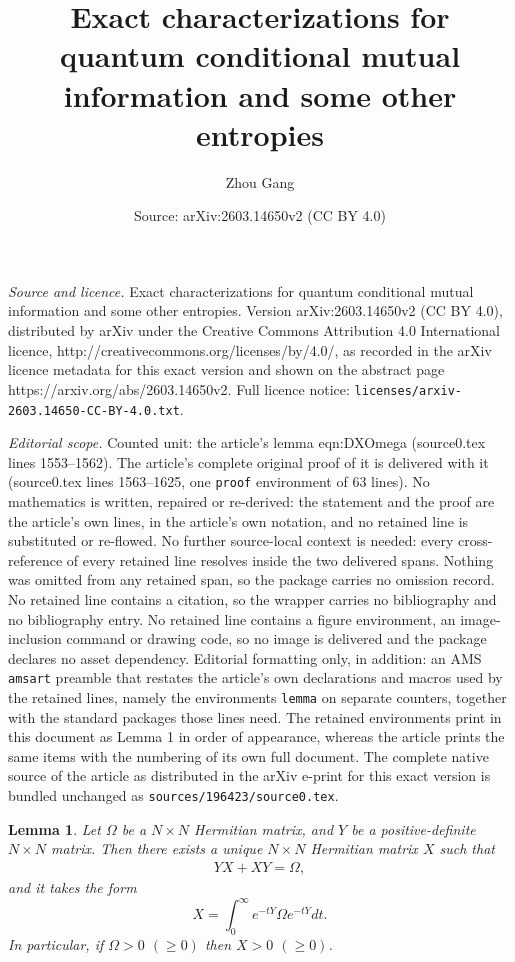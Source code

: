 \documentclass[10pt,a4paper]{amsart}
\title{Exact characterizations for quantum conditional mutual information and some other entropies}
\author{Zhou Gang}
\date{Source: arXiv:2603.14650v2 (CC BY 4.0)}
\newtheorem{lemma}{Lemma}
\begin{document}
\maketitle

\noindent\emph{Source and licence.} Exact characterizations for quantum conditional mutual information and some other entropies. Version arXiv:2603.14650v2 (CC BY 4.0), distributed by arXiv under the Creative Commons Attribution 4.0 International licence, http://creativecommons.org/licenses/by/4.0/, as recorded in the arXiv licence metadata for this exact version and shown on the abstract page https://arxiv.org/abs/2603.14650v2. Full licence notice: \texttt{licenses/arxiv-2603.14650-CC-BY-4.0.txt}.\par\smallskip

\noindent\textit{Editorial scope.} Counted unit: the article's lemma eqn:DXOmega (source0.tex lines 1553--1562). The article's complete original proof of it is delivered with it (source0.tex lines 1563--1625, one \texttt{proof} environment of 63 lines). No mathematics is written, repaired or re-derived: the statement and the proof are the article's own lines, in the article's own notation, and no retained line is substituted or re-flowed.  No further source-local context is needed: every cross-reference of every retained line resolves inside the two delivered spans.  Nothing was omitted from any retained span, so the package carries no omission record.  No retained line contains a citation, so the wrapper carries no bibliography and no bibliography entry.  No retained line contains a figure environment, an image-inclusion command or drawing code, so no image is delivered and the package declares no asset dependency.  Editorial formatting only, in addition: an AMS \texttt{amsart} preamble that restates the article's own declarations and macros used by the retained lines, namely the environments \texttt{lemma} on separate counters, together with the standard packages those lines need.  The retained environments print in this document as Lemma 1 in order of appearance, whereas the article prints the same items with the numbering of its own full document.  The complete native source of the article as distributed in the arXiv e-print for this exact version is bundled unchanged as \texttt{sources/196423/source0.tex}.
\begin{lemma} 
Let $\Omega$ be a $N\times N$ Hermitian matrix, and $Y$ be a positive-definite $N\times N$ matrix. Then there exists a unique $N\times N$ Hermitian matrix $X$ such that
\begin{align}\label{eqn:DXOmega}
YX + XY = \Omega, 
\end{align} and it takes the form
\begin{equation}\label{eq:DXomega}
X = \int_{0}^{\infty} e^{-tY} \Omega e^{-tY} dt.
\end{equation}
In particular, if $\Omega > 0$ $(\geq 0)$ then $X > 0$ $(\geq 0)$.
\end{lemma}
\end{document}
